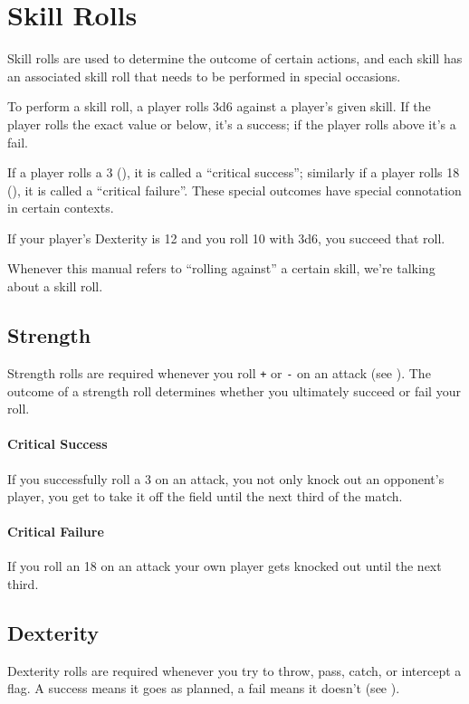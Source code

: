 \section{Skill Rolls}\label{skill-rolls}
Skill rolls are used to determine the outcome of certain actions, and each skill has an associated skill roll that needs to be performed in special occasions.

To perform a skill roll, a player rolls 3d6 against a player's given skill.
If the player rolls the exact value or below, it's a success; if the player rolls above it's a fail.

If a player rolls a 3 (), it is called a ``critical success''; similarly if a player rolls 18 (), it is called a ``critical failure''.
These special outcomes have special connotation in certain contexts.

\begin{example}
    If your player's Dexterity is 12 and you roll 10 with 3d6, you succeed that roll.
\end{example}

\begin{note}
    Whenever this manual refers to ``rolling against'' a certain skill, we're talking about a skill roll.
\end{note}

\subsection{Strength}
Strength rolls are required whenever you roll \texttt{+} or \texttt{-} on an attack (see ).
The outcome of a strength roll determines whether you ultimately succeed or fail your roll.

\paragraph{Critical Success} If you successfully roll a 3 on an attack, you not only knock out an opponent's player, you get to take it off the field until the next third of the match.

\paragraph{Critical Failure} If you roll an 18 on an attack your own player gets knocked out until the next third.
\subsection{Dexterity}
Dexterity rolls are required whenever you try to throw, pass, catch, or intercept a flag.
A success means it goes as planned, a fail means it doesn't (see ).

